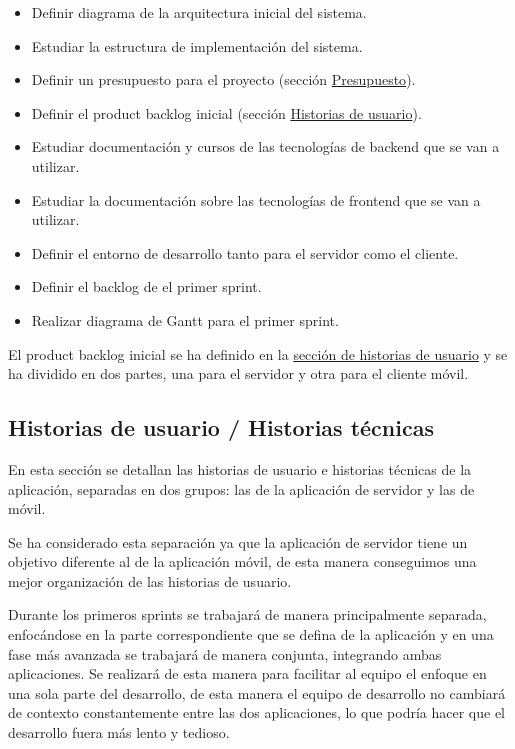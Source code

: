 \begin{itemize}
    \item Definir diagrama de la arquitectura inicial del sistema.
    \item Estudiar la estructura de implementación del sistema.
    \item Definir un presupuesto para el proyecto (sección \hyperref[sec:presupuesto]{Presupuesto}).
    \item Definir el product backlog inicial (sección \hyperref[sec:historias-de-usuario]{Historias de usuario}).
    \item Estudiar documentación y cursos de las tecnologías de backend que se van a utilizar.
    \item Estudiar la documentación sobre las tecnologías de frontend que se van a utilizar.
    \item Definir el entorno de desarrollo tanto para el servidor como el cliente.
    \item Definir el backlog de el primer sprint.
    \item Realizar diagrama de Gantt para el primer sprint.
\end{itemize}

El product backlog inicial se ha definido en la \hyperref[sec:historias-de-usuario]{sección de historias de usuario} y se ha dividido en dos partes, una para el servidor y otra para el cliente móvil.

\subsection{Historias de usuario / Historias técnicas}
\label{sec:historias-de-usuario}
En esta sección se detallan las historias de usuario e historias técnicas de la aplicación, separadas en dos grupos: las de la aplicación de servidor y las de móvil.

Se ha considerado esta separación ya que la aplicación de servidor tiene un objetivo diferente al de la aplicación móvil, de esta manera conseguimos una mejor organización de las historias de usuario.

Durante los primeros sprints se trabajará de manera principalmente separada, enfocándose en la parte correspondiente que se defina de la aplicación y en una fase más avanzada se trabajará de manera conjunta, integrando ambas aplicaciones. Se realizará de esta manera para facilitar al equipo el enfoque en una sola parte del desarrollo, de esta manera el equipo de desarrollo no cambiará de contexto constantemente entre las dos aplicaciones, lo que podría hacer que el desarrollo fuera más lento y tedioso.

